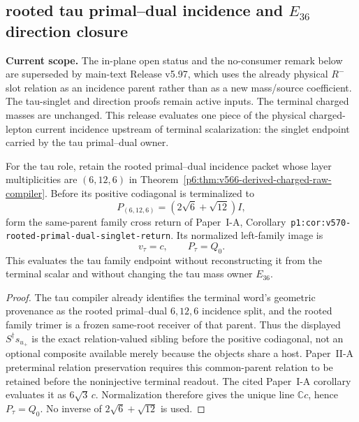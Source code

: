 \documentclass[12pt,a4paper]{article}
\begin{document}
\subsection{rooted tau primal--dual incidence and $E_{36}$ direction closure}
\label{p6:sec:v596-tau-primal-dual-incidence-closure}
\noindent\textbf{Current scope.} The in-plane open status and the no-consumer remark below are superseded by main-text Release v5.97, which uses the already physical $R^-$ slot relation as an incidence parent rather than as a new mass/source coefficient.  The tau-singlet and direction proofs remain active inputs.
The terminal charged masses are unchanged.  This release evaluates one piece
of the physical charged-lepton current incidence upstream of terminal
scalarization: the singlet endpoint carried by the tau primal--dual owner.

\begin{theorem}
\label{p6:thm:v596-tau-singlet-return}
For the tau role, retain the rooted primal--dual incidence packet whose layer
multiplicities are $(6,12,6)$ in
Theorem~\ref{p6:thm:v566-derived-charged-raw-compiler}.  Before its positive
codiagonal is terminalized to
\[
 P_{(6,12,6)}=(2\sqrt6+\sqrt{12})I,
\]
form the same-parent family cross return of Paper~I-A,
Corollary~\texttt{p1:cor:v570-\allowbreak rooted-\allowbreak primal-\allowbreak dual-\allowbreak singlet-\allowbreak return}.  Its
normalized left-family image is
\[
 \boxed{v_\tau=c,\qquad P_\tau=Q_0.}
\]
This evaluates the tau family endpoint without reconstructing it from the
terminal scalar and without changing the tau mass owner $E_{36}$.
\end{theorem}
\begin{proof}
The tau compiler already identifies the terminal word's geometric provenance
as the rooted primal--dual $6,12,6$ incidence split, and the rooted family
trimer is a frozen same-root receiver of that parent.  Thus the displayed
$S^\dagger s_{u_+}$ is the exact relation-valued sibling before the positive
codiagonal, not an optional composite available merely because the objects
share a host.  Paper~II-A preterminal relation preservation requires this
common-parent relation to be retained before the noninjective terminal
readout.  The cited Paper~I-A corollary evaluates it as $6\sqrt3\,c$.
Normalization therefore gives the unique line $\mathbb Cc$, hence
$P_\tau=Q_0$.  No inverse of $2\sqrt6+\sqrt{12}$ is used.
\end{proof}
\end{document}
